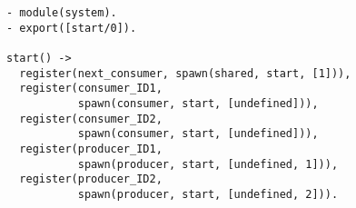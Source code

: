 \begin{figure}[h!]
\begin{verbatim}
- module(system).
- export([start/0]).

start() -> 
  register(next_consumer, spawn(shared, start, [1])),
  register(consumer_ID1,
           spawn(consumer, start, [undefined])),
  register(consumer_ID2,
           spawn(consumer, start, [undefined])),
  register(producer_ID1,
           spawn(producer, start, [undefined, 1])),
  register(producer_ID2,
           spawn(producer, start, [undefined, 2])).
\end{verbatim}
\end{figure}


